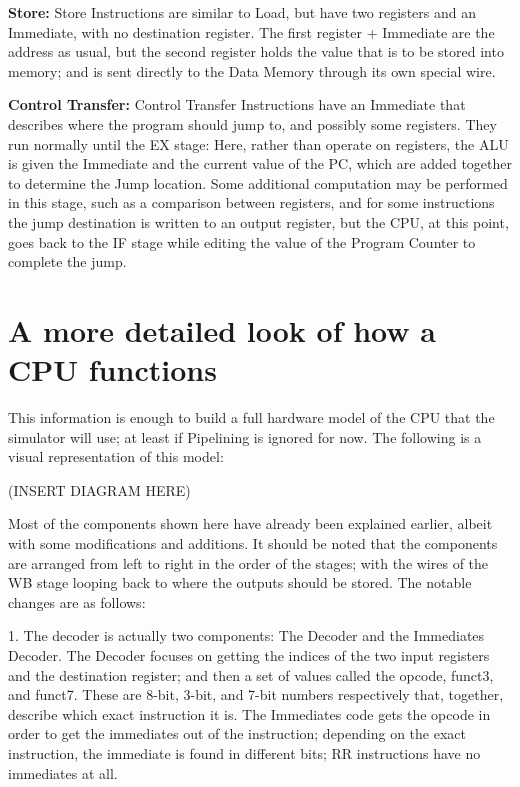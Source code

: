 \documentclass[12pt,twoside]{reedthesis}
\begin{document}
\textbf{Store:} Store Instructions are similar to Load, but have two registers and an Immediate, with no destination register. The first register + Immediate are the address as usual, but the second register holds the value that is to be stored into memory; and is sent directly to the Data Memory through its own special wire.

\textbf{Control Transfer:} Control Transfer Instructions have an Immediate that describes where the program should jump to, and possibly some registers. They run normally until the EX stage: Here, rather than operate on registers, the ALU is given the Immediate and the current value of the PC, which are added together to determine the Jump location. Some additional computation may be performed in this stage, such as a comparison between registers, and for some instructions the jump destination is written to an output register, but the CPU, at this point, goes back to the IF stage while editing the value of the Program Counter to complete the jump.

\section{A more detailed look of how a CPU functions}

This information is enough to build a full hardware model of the CPU that the simulator will use; at least if Pipelining is ignored for now. The following is a visual representation of this model:

(INSERT DIAGRAM HERE)

Most of the components shown here have already been explained earlier, albeit with some modifications and additions. It should be noted that the components are arranged from left to right in the order of the stages; with the wires of the WB stage looping back to where the outputs should be stored. The notable changes are as follows:

1. The decoder is actually two components: The Decoder and the Immediates Decoder. The Decoder focuses on getting the indices of the two input registers and the destination register; and then a set of values called the opcode, funct3, and funct7. These are 8-bit, 3-bit, and 7-bit numbers respectively that, together, describe which exact instruction it is. The Immediates code gets the opcode in order to get the immediates out of the instruction; depending on the exact instruction, the immediate is found in different bits; RR instructions have no immediates at all.
\end{document}
